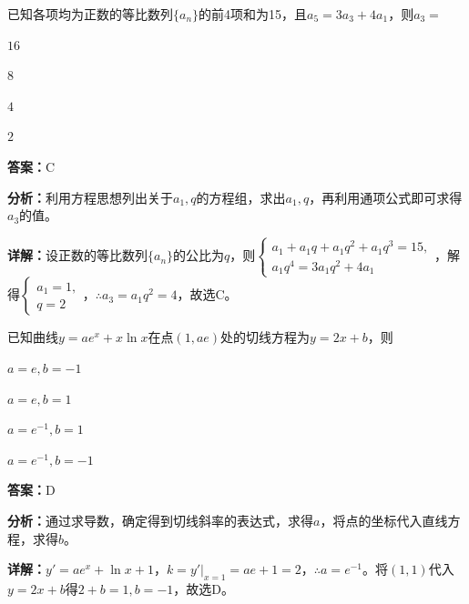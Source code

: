 \begin{question}[points=5]
已知各项均为正数的等比数列$\{a_n\}$的前4项和为15，且$a_5=3a_3+4a_1$，则$a_3=$
\begin{choices}
  \item $16$
  \item $8$
  \item $4$
  \item $2$
\end{choices}
\begin{solution}
\textbf{答案：}C

\textbf{分析：}利用方程思想列出关于$a_1,q$的方程组，求出$a_1,q$，再利用通项公式即可求得$a_3$的值。

\textbf{详解：}设正数的等比数列$\{a_n\}$的公比为$q$，则$\begin{cases} a_1+a_1q+a_1q^2+a_1q^3=15, \\ a_1q^4=3a_1q^2+4a_1 \end{cases}$，解得$\begin{cases} a_1=1, \\ q=2 \end{cases}$，$\therefore a_3=a_1q^2=4$，故选C。
\end{solution}
\end{question}

\begin{question}[points=5]
已知曲线$y=ae^x+x\ln x$在点$(1,ae)$处的切线方程为$y=2x+b$，则
\begin{choices}
  \item $a=e,b=-1$
  \item $a=e,b=1$
  \item $a=e^{-1},b=1$
  \item $a=e^{-1},b=-1$
\end{choices}
\begin{solution}
\textbf{答案：}D

\textbf{分析：}通过求导数，确定得到切线斜率的表达式，求得$a$，将点的坐标代入直线方程，求得$b$。

\textbf{详解：}$y'=ae^x+\ln x+1$，$k=y'|_{x=1}=ae+1=2$，$\therefore a=e^{-1}$。将$(1,1)$代入$y=2x+b$得$2+b=1,b=-1$，故选D。
\end{solution}
\end{question}

